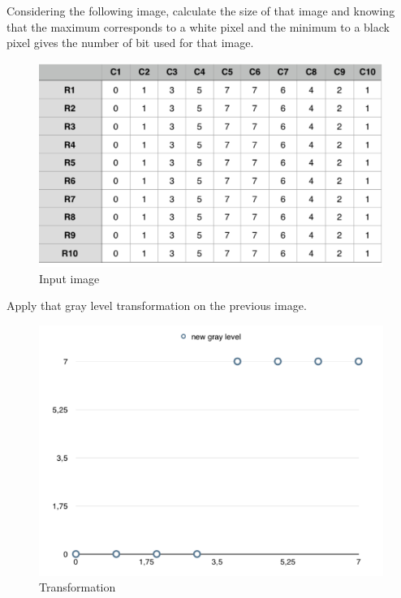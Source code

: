 \documentclass[12pt]{tdtp}
\begin{document}
\titre

\Exo

Considering the following image, calculate the size of that image and knowing that the maximum corresponds to a white pixel and the minimum to a black pixel gives the number of bit used for that image.



\begin{figure}[h!]
	\begin{center}
		\includegraphics[scale=0.5]{images/I1.png}
		\caption{Input image}
	\end{center}
\end{figure}

\newpage 
\Exo

Apply that gray level transformation on the previous image.

\begin{figure}[h!]
	\begin{center}
		\includegraphics[scale=0.5]{images/I2.png}
		\caption{Transformation}
	\end{center}
\end{figure}
\end{document}
